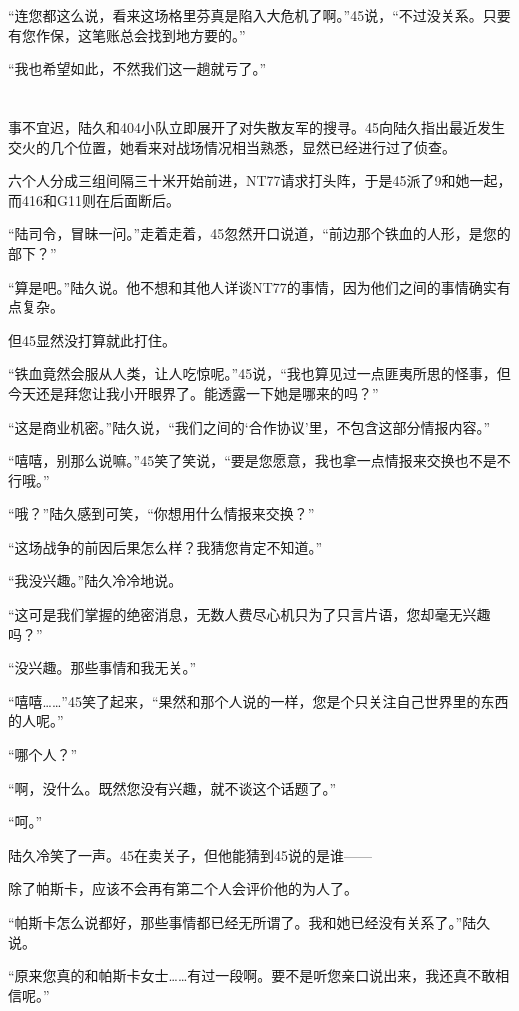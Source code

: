 “连您都这么说，看来这场格里芬真是陷入大危机了啊。”45说，“不过没关系。只要有您作保，这笔账总会找到地方要的。”

“我也希望如此，不然我们这一趟就亏了。”

\section*{}

事不宜迟，陆久和404小队立即展开了对失散友军的搜寻。45向陆久指出最近发生交火的几个位置，她看来对战场情况相当熟悉，显然已经进行过了侦查。

六个人分成三组间隔三十米开始前进，NT77请求打头阵，于是45派了9和她一起，而416和G11则在后面断后。

“陆司令，冒昧一问。”走着走着，45忽然开口说道，“前边那个铁血的人形，是您的部下？”

“算是吧。”陆久说。他不想和其他人详谈NT77的事情，因为他们之间的事情确实有点复杂。

但45显然没打算就此打住。

“铁血竟然会服从人类，让人吃惊呢。”45说，“我也算见过一点匪夷所思的怪事，但今天还是拜您让我小开眼界了。能透露一下她是哪来的吗？”

“这是商业机密。”陆久说，“我们之间的‘合作协议’里，不包含这部分情报内容。”

“嘻嘻，别那么说嘛。”45笑了笑说，“要是您愿意，我也拿一点情报来交换也不是不行哦。”

“哦？”陆久感到可笑，“你想用什么情报来交换？”

“这场战争的前因后果怎么样？我猜您肯定不知道。”

“我没兴趣。”陆久冷冷地说。

“这可是我们掌握的绝密消息，无数人费尽心机只为了只言片语，您却毫无兴趣吗？”

“没兴趣。那些事情和我无关。”

“嘻嘻……”45笑了起来，“果然和那个人说的一样，您是个只关注自己世界里的东西的人呢。”

“哪个人？”

“啊，没什么。既然您没有兴趣，就不谈这个话题了。”

“呵。”

陆久冷笑了一声。45在卖关子，但他能猜到45说的是谁——

除了帕斯卡，应该不会再有第二个人会评价他的为人了。

“帕斯卡怎么说都好，那些事情都已经无所谓了。我和她已经没有关系了。”陆久说。

“原来您真的和帕斯卡女士……有过一段啊。要不是听您亲口说出来，我还真不敢相信呢。”

